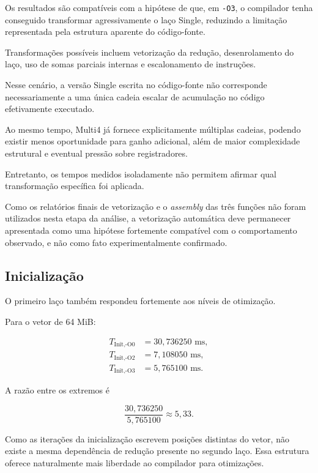 Os resultados são compatíveis com a hipótese de que, em \texttt{-O3}, o compilador tenha
conseguido transformar agressivamente o laço Single, reduzindo a limitação representada pela
estrutura aparente do código-fonte.

Transformações possíveis incluem vetorização da redução, desenrolamento do laço, uso de
somas parciais internas e escalonamento de instruções.

Nesse cenário, a versão Single escrita no código-fonte não corresponde necessariamente a uma
única cadeia escalar de acumulação no código efetivamente executado.

Ao mesmo tempo, Multi4 já fornece explicitamente múltiplas cadeias, podendo existir menos
oportunidade para ganho adicional, além de maior complexidade estrutural e eventual pressão
sobre registradores.

Entretanto, os tempos medidos isoladamente não permitem afirmar qual transformação específica
foi aplicada.

Como os relatórios finais de vetorização e o \textit{assembly} das três funções não foram
utilizados nesta etapa da análise, a vetorização automática deve permanecer apresentada como
uma hipótese fortemente compatível com o comportamento observado, e não como fato
experimentalmente confirmado.


\subsection{Inicialização}

O primeiro laço também respondeu fortemente aos níveis de otimização.

Para o vetor de 64 MiB:

\begin{align}
T_{\text{Init,-O0}} &= 30{,}736250\text{ ms},\\
T_{\text{Init,-O2}} &= 7{,}108050\text{ ms},\\
T_{\text{Init,-O3}} &= 5{,}765100\text{ ms}.
\end{align}

A razão entre os extremos é

\begin{equation}
\frac{30{,}736250}{5{,}765100}
\approx
5{,}33.
\end{equation}

Como as iterações da inicialização escrevem posições distintas do vetor, não existe a mesma
dependência de redução presente no segundo laço. Essa estrutura oferece naturalmente mais
liberdade ao compilador para otimizações.


